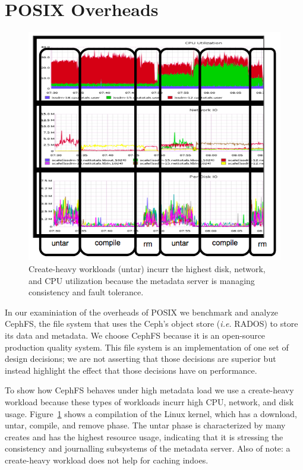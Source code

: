 \section{POSIX Overheads}
\label{sec:posix-overheads}

\begin{figure}[tb]
\centering
\includegraphics[width=1.0\linewidth]{figures/creates-motivation.png}
\caption{Create-heavy workloads (untar) incurr the highest disk, network, and CPU
utilization because the metadata server is managing consistency and fault
tolerance.}\label{fig:creates-motivation}
\end{figure}

In our examiniation of the overheads of POSIX we benchmark and analyze CephFS,
the file system that uses the Ceph's object store ({\it i.e.} RADOS) to store
its data and metadata. We choose CephFS because it is an open-source production
quality system. This file system is an implementation of one set of design
decisions; we are not asserting that those decisions are superior but instead
highlight the effect that those decisions have on performance.

To show how CephFS behaves under high metadata load we use a create-heavy
workload because these types of workloads incurr high CPU, network, and disk
usage.  Figure~\ref{fig:creates-motivation} shows a compilation of the Linux
kernel, which has a download, untar, compile, and remove phase. The untar phase
is characterized by many creates and has the highest resource usage, indicating
that it is stressing the consistency and journalling subsystems of the metadata
server. Also of note: a create-heavy workload does not help for caching indoes.

